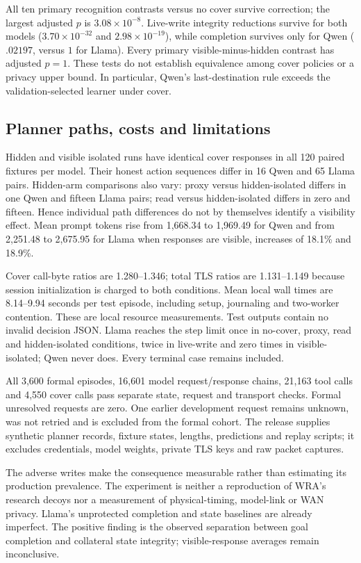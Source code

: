 All ten primary recognition contrasts versus no cover survive correction; the largest adjusted $p$ is $3.08\times10^{-8}$. Live-write integrity reductions survive for both models ($3.70\times10^{-32}$ and $2.98\times10^{-19}$), while completion survives only for Qwen ($.02197$, versus $1$ for Llama). Every primary visible-minus-hidden contrast has adjusted $p=1$. These tests do not establish equivalence among cover policies or a privacy upper bound. In particular, Qwen's last-destination rule exceeds the validation-selected learner under cover.



\subsection{Planner paths, costs and limitations}
Hidden and visible isolated runs have identical cover responses in all 120 paired fixtures per model. Their honest action sequences differ in 16 Qwen and 65 Llama pairs. Hidden-arm comparisons also vary: proxy versus hidden-isolated differs in one Qwen and fifteen Llama pairs; read versus hidden-isolated differs in zero and fifteen. Hence individual path differences do not by themselves identify a visibility effect. Mean prompt tokens rise from 1,668.34 to 1,969.49 for Qwen and from 2,251.48 to 2,675.95 for Llama when responses are visible, increases of 18.1\% and 18.9\%.

Cover call-byte ratios are 1.280--1.346; total TLS ratios are 1.131--1.149 because session initialization is charged to both conditions. Mean local wall times are 8.14--9.94 seconds per test episode, including setup, journaling and two-worker contention. These are local resource measurements. Test outputs contain no invalid decision JSON. Llama reaches the step limit once in no-cover, proxy, read and hidden-isolated conditions, twice in live-write and zero times in visible-isolated; Qwen never does. Every terminal case remains included.

All 3,600 formal episodes, 16,601 model request/response chains, 21,163 tool calls and 4,550 cover calls pass separate state, request and transport checks. Formal unresolved requests are zero. One earlier development request remains unknown, was not retried and is excluded from the formal cohort. The release supplies synthetic planner records, fixture states, lengths, predictions and replay scripts; it excludes credentials, model weights, private TLS keys and raw packet captures.

The adverse writes make the consequence measurable rather than estimating its production prevalence. The experiment is neither a reproduction of WRA's research decoys nor a measurement of physical-timing, model-link or WAN privacy. Llama's unprotected completion and state baselines are already imperfect. The positive finding is the observed separation between goal completion and collateral state integrity; visible-response averages remain inconclusive.
